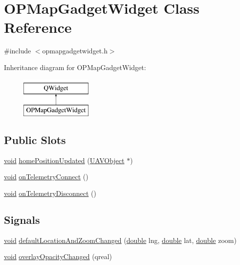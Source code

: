 \hypertarget{class_o_p_map_gadget_widget}{\section{O\-P\-Map\-Gadget\-Widget Class Reference}
\label{class_o_p_map_gadget_widget}
}


{\ttfamily \#include $<$opmapgadgetwidget.\-h$>$}

Inheritance diagram for O\-P\-Map\-Gadget\-Widget\-:\begin{figure}[H]
\begin{center}
\leavevmode
\includegraphics[height=2.000000cm]{class_o_p_map_gadget_widget}
\end{center}
\end{figure}
\subsection*{Public Slots}
\begin{DoxyCompactItemize}
\item 
\hyperlink{group___u_a_v_objects_plugin_ga444cf2ff3f0ecbe028adce838d373f5c}{void} \hyperlink{group___o_p_map_plugin_gae67526d9495209b93360c1fae84e3d47}{home\-Position\-Updated} (\hyperlink{class_u_a_v_object}{U\-A\-V\-Object} $\ast$)
\item 
\hyperlink{group___u_a_v_objects_plugin_ga444cf2ff3f0ecbe028adce838d373f5c}{void} \hyperlink{group___o_p_map_plugin_gad7068b438d89bb8f2a9e31ef5ca2d708}{on\-Telemetry\-Connect} ()
\item 
\hyperlink{group___u_a_v_objects_plugin_ga444cf2ff3f0ecbe028adce838d373f5c}{void} \hyperlink{group___o_p_map_plugin_ga723918dc2ebb03ce17180228e4233d06}{on\-Telemetry\-Disconnect} ()
\end{DoxyCompactItemize}
\subsection*{Signals}
\begin{DoxyCompactItemize}
\item 
\hyperlink{group___u_a_v_objects_plugin_ga444cf2ff3f0ecbe028adce838d373f5c}{void} \hyperlink{group___o_p_map_plugin_ga1e2bbe9f774b6c505ba7645a868f1c52}{default\-Location\-And\-Zoom\-Changed} (\hyperlink{_super_l_u_support_8h_a8956b2b9f49bf918deed98379d159ca7}{double} lng, \hyperlink{_super_l_u_support_8h_a8956b2b9f49bf918deed98379d159ca7}{double} lat, \hyperlink{_super_l_u_support_8h_a8956b2b9f49bf918deed98379d159ca7}{double} zoom)
\item 
\hyperlink{group___u_a_v_objects_plugin_ga444cf2ff3f0ecbe028adce838d373f5c}{void} \hyperlink{group___o_p_map_plugin_gaa3099fde3c8867538207ed89067345eb}{overlay\-Opacity\-Changed} (qreal)
\end{DoxyCompactItemize}
